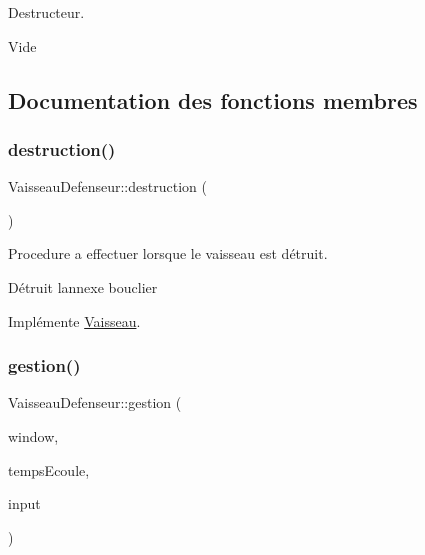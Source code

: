Destructeur. 

Vide 

\subsection{Documentation des fonctions membres}
\mbox{\label{class_vaisseau_defenseur_a6816d325d737269cddc6310e7f68b222}} 
\subsubsection{\texorpdfstring{destruction()}{destruction()}}
{\footnotesize\ttfamily Vaisseau\+Defenseur\+::destruction (\begin{DoxyParamCaption}{ }\end{DoxyParamCaption})\hspace{0.3cm}{\ttfamily [virtual]}}



Procedure a effectuer lorsque le vaisseau est détruit. 

Détruit l\textquotesingle{}annexe bouclier 

Implémente \hyperlink{class_vaisseau_af4f490c5fd9e171b23067ec73aa737ad}{Vaisseau}.

\mbox{\label{class_vaisseau_defenseur_adb26b3df0bb5888548ff897f23e2ec82}} 
\subsubsection{\texorpdfstring{gestion()}{gestion()}}
{\footnotesize\ttfamily Vaisseau\+Defenseur\+::gestion (\begin{DoxyParamCaption}\item[{sf\+::\+Render\+Window \&}]{window,  }\item[{sf\+::\+Time}]{temps\+Ecoule,  }\item[{\hyperlink{_input_8h_a5588d60d674991c719a8df848313e966}{Input} \&}]{input }\end{DoxyParamCaption})\hspace{0.3cm}{\ttfamily [virtual]}}



